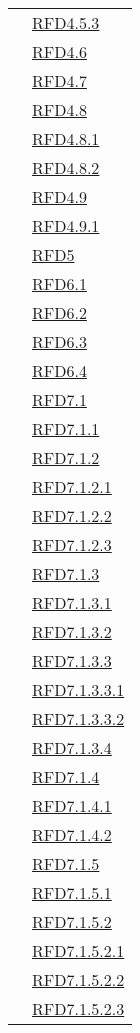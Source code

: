 \begin{longtable}{|>{\centering}m{5cm}|m{5cm}<{\centering}|}
& \hyperlink{RFD4.5.3}{RFD4.5.3}\\
& \hyperlink{RFD4.6}{RFD4.6}\\
& \hyperlink{RFD4.7}{RFD4.7}\\
& \hyperlink{RFD4.8}{RFD4.8}\\
& \hyperlink{RFD4.8.1}{RFD4.8.1}\\
& \hyperlink{RFD4.8.2}{RFD4.8.2}\\
& \hyperlink{RFD4.9}{RFD4.9}\\
& \hyperlink{RFD4.9.1}{RFD4.9.1}\\
& \hyperlink{RFD5}{RFD5}\\
& \hyperlink{RFD6.1}{RFD6.1}\\
& \hyperlink{RFD6.2}{RFD6.2}\\
& \hyperlink{RFD6.3}{RFD6.3}\\
& \hyperlink{RFD6.4}{RFD6.4}\\
& \hyperlink{RFD7.1}{RFD7.1}\\
& \hyperlink{RFD7.1.1}{RFD7.1.1}\\
& \hyperlink{RFD7.1.2}{RFD7.1.2}\\
& \hyperlink{RFD7.1.2.1}{RFD7.1.2.1}\\
& \hyperlink{RFD7.1.2.2}{RFD7.1.2.2}\\
& \hyperlink{RFD7.1.2.3}{RFD7.1.2.3}\\
& \hyperlink{RFD7.1.3}{RFD7.1.3}\\
& \hyperlink{RFD7.1.3.1}{RFD7.1.3.1}\\
& \hyperlink{RFD7.1.3.2}{RFD7.1.3.2}\\
& \hyperlink{RFD7.1.3.3}{RFD7.1.3.3}\\
& \hyperlink{RFD7.1.3.3.1}{RFD7.1.3.3.1}\\
& \hyperlink{RFD7.1.3.3.2}{RFD7.1.3.3.2}\\
& \hyperlink{RFD7.1.3.4}{RFD7.1.3.4}\\
& \hyperlink{RFD7.1.4}{RFD7.1.4}\\
& \hyperlink{RFD7.1.4.1}{RFD7.1.4.1}\\
& \hyperlink{RFD7.1.4.2}{RFD7.1.4.2}\\
& \hyperlink{RFD7.1.5}{RFD7.1.5}\\
& \hyperlink{RFD7.1.5.1}{RFD7.1.5.1}\\
& \hyperlink{RFD7.1.5.2}{RFD7.1.5.2}\\
& \hyperlink{RFD7.1.5.2.1}{RFD7.1.5.2.1}\\
& \hyperlink{RFD7.1.5.2.2}{RFD7.1.5.2.2}\\
& \hyperlink{RFD7.1.5.2.3}{RFD7.1.5.2.3}\\

\end{longtable}

